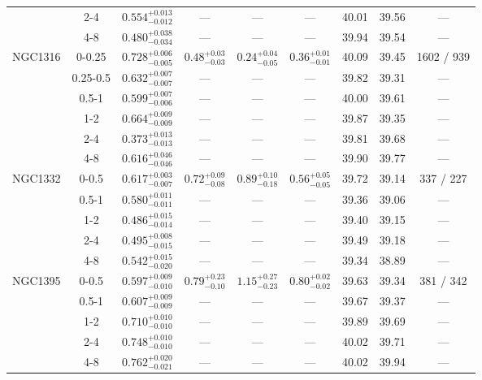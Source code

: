 \documentclass[structabstract]{aa}
\begin{document}
{{\begin{longtable}{lcccccccc}
 & 2-4 & $ 0.554 _{- 0.012 }^{+ 0.013 } $ & --- & --- & --- &  40.01 & 39.56 & --- \\
 & 4-8 & $ 0.480 _{- 0.034 }^{+ 0.038 } $ & --- & --- & --- &  39.94 & 39.54 & --- \\
\hline
NGC1316 & 0-0.25 & $ 0.728 _{- 0.005 }^{+ 0.006 } $ & $  0.48 _{-  0.03 }^{+  0.03 } $ & $  0.24 _{-  0.05 }^{+  0.04 } $ & $  0.36 _{-  0.01 }^{+  0.01 } $ &  40.09 & 39.45 &  1602 /   939 \\
 & 0.25-0.5 & $ 0.632 _{- 0.007 }^{+ 0.007 } $ & --- & --- & --- &  39.82 & 39.31 & --- \\
 & 0.5-1 & $ 0.599 _{- 0.006 }^{+ 0.007 } $ & --- & --- & --- &  40.00 & 39.61 & --- \\
 & 1-2 & $ 0.664 _{- 0.009 }^{+ 0.009 } $ & --- & --- & --- &  39.87 & 39.35 & --- \\
 & 2-4 & $ 0.373 _{- 0.013 }^{+ 0.013 } $ & --- & --- & --- &  39.81 & 39.68 & --- \\
 & 4-8 & $ 0.616 _{- 0.046 }^{+ 0.046 } $ & --- & --- & --- &  39.90 & 39.77 & --- \\
\hline
NGC1332 & 0-0.5 & $ 0.617 _{- 0.007 }^{+ 0.003 } $ & $  0.72 _{-  0.08 }^{+  0.09 } $ & $  0.89 _{-  0.18 }^{+  0.10 } $ & $  0.56 _{-  0.05 }^{+  0.05 } $ &  39.72 & 39.14 &   337 /   227 \\
 & 0.5-1 & $ 0.580 _{- 0.011 }^{+ 0.011 } $ & --- & --- & --- &  39.36 &  39.06 & --- \\
 & 1-2 & $ 0.486 _{- 0.014 }^{+ 0.015 } $ & --- & --- & --- &  39.40 & 39.15 & --- \\
 & 2-4 & $ 0.495 _{- 0.015 }^{+ 0.008 } $ & --- & --- & --- &  39.49 & 39.18 & --- \\
 & 4-8 & $ 0.542 _{- 0.020 }^{+ 0.015 } $ & --- & --- & --- &  39.34 & 38.89 & --- \\
\hline
NGC1395 & 0-0.5 & $ 0.597 _{- 0.010 }^{+ 0.009 } $ & $  0.79 _{-  0.10 }^{+  0.23 } $ & $  1.15 _{-  0.23 }^{+  0.27 } $ & $  0.80 _{-  0.02 }^{+  0.02 } $ &  39.63 & 39.34 &   381 /   342 \\
 & 0.5-1 & $ 0.607 _{- 0.009 }^{+ 0.009 } $ & --- & --- & --- &  39.67 & 39.37 & --- \\
 & 1-2 & $ 0.710 _{- 0.010 }^{+ 0.010 } $ & --- & --- & --- &  39.89 & 39.69 & --- \\
 & 2-4 & $ 0.748 _{- 0.010 }^{+ 0.010 } $ & --- & --- & --- &  40.02 & 39.71 & --- \\
 & 4-8 & $ 0.762 _{- 0.021 }^{+ 0.020 } $ & --- & --- & --- &  40.02 & 39.94 & --- \\

\end{longtable}}}
\end{document}
